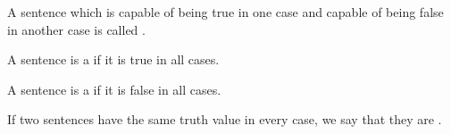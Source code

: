\begin{definition}[Contingent]{}
    A sentence which is capable of being true in one case and capable of being false in another case is called .
\end{definition}

\begin{definition}
    A sentence is a  if it is true in all cases.
\end{definition}

\begin{definition}
    A sentence is a  if it is false in all cases.
\end{definition}

\begin{definition}
    If two sentences have the same truth value in every case, we say that they are .
\end{definition}
